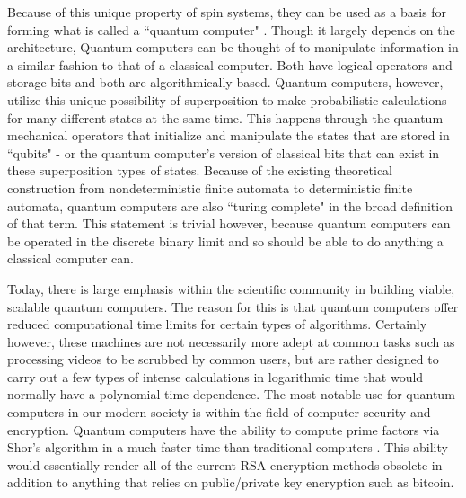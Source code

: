 \documentclass[oneside, astronomy, noacknowlegments]{BYUPhys}
\begin{document}
Because of this unique property of spin systems, they can be used as a basis for forming what is called a ``quantum computer" \cite{RefWorks:doc:58929746e4b0dec22aee3a9a}. Though it largely depends on the architecture, Quantum computers can be thought of to manipulate information in a similar fashion to that of a classical computer. Both have logical operators and storage bits and both are algorithmically based. Quantum computers, however, utilize this unique possibility of superposition to make probabilistic calculations for many different states at the same time. This happens through the quantum mechanical operators that initialize and manipulate the states that are stored in ``qubits" - or the quantum computer's version of classical bits that can exist in these superposition types of states. Because of the existing theoretical construction from nondeterministic finite automata to deterministic finite automata, quantum computers are also ``turing complete" in the broad definition of that term. This statement is trivial however, because quantum computers can be operated in the discrete binary limit and so should be able to do anything a classical computer can.

Today, there is large emphasis within the scientific community in building viable, scalable quantum computers. The reason for this is that quantum computers offer reduced computational time limits for certain types of algorithms. Certainly however, these machines are not necessarily more adept at common tasks such as processing videos to be scrubbed by common users, but are rather designed to carry out a few types of intense calculations in logarithmic time that would normally have a polynomial time dependence. The most notable use for quantum computers in our modern society is within the field of computer security and encryption. Quantum computers have the ability to compute prime factors via Shor's algorithm in a much faster time than traditional computers \cite{RefWorks:doc:589296c6e4b0d4c09201f6f5}. This ability would essentially render all of the current RSA encryption methods obsolete in addition to anything that relies on public/private key encryption such as bitcoin.
\end{document}
